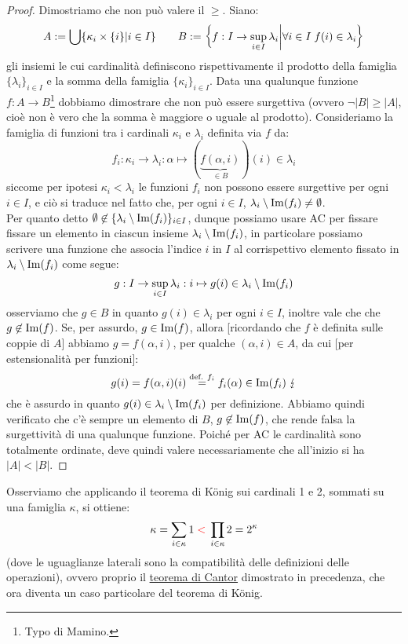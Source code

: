 \begin{proof}
	Dimostriamo che non può valere il $\geq$. Siano:
	\[ A := \bigcup\{\kappa_i \times \{i\} | i \in I\} \qquad B := \left\{f : I \rightarrow \sup_{i \in I} \lambda_i \middle| \forall i \in I \; f(i) \in \lambda_i\right\} 
		\]
	gli insiemi le cui cardinalità definiscono rispettivamente il prodotto della famiglia $\{\lambda_i\}_{i \in I}$ e la somma della famiglia $\{\kappa_i\}_{i \in I}$.
	Data una qualunque funzione $f : A \rightarrow B$\footnote{Typo di Mamino.} dobbiamo dimostrare che non può essere surgettiva (ovvero $\neg |B| \geq |A|$, cioè non è vero che la somma è maggiore o uguale al prodotto).
	Consideriamo la famiglia di funzioni tra i cardinali $\kappa_i$ e $\lambda_i$ definita via $f$ da:
	\[ f_i : \kappa_i \to \lambda_i : \alpha \mapsto (\underbrace{f(\alpha,i)}_{\in B})(i) \in \lambda_i
		\]
 	siccome per ipotesi $\kappa_i < \lambda_i$ le funzioni $f_i$ non possono essere surgettive per ogni $i \in I$, e ciò si traduce nel fatto che, per ogni $i \in I$, $\lambda_i \setminus\operatorname{Im}(f_i) \ne \emptyset$.\\
	Per quanto detto $\emptyset \not \in \{\lambda_i \setminus\operatorname{Im}(f_i)\}_{i \in I}$, dunque possiamo usare AC per fissare fissare un elemento in ciascun insieme $\lambda_i \setminus\operatorname{Im}(f_i)$, in particolare possiamo
	scrivere una funzione che associa l'indice $i$ in $I$ al corrispettivo elemento fissato in $\lambda_i \setminus \operatorname{Im}(f_i)$ come segue:
	\[ g : I \rightarrow \sup_{i \in I} \lambda_i : i \mapsto g(i) \in \lambda_i \setminus \operatorname{Im}(f_i)
		\]
	osserviamo che $g \in B$ in quanto $g(i) \in \lambda_i$ per ogni $i \in I$, inoltre vale che che $g \not \in \operatorname{Im}(f)$. Se, per assurdo, $g \in \operatorname{Im}(f)$, allora [ricordando che $f$ è definita sulle coppie di $A$]
	abbiamo $g = f(\alpha,i)$, per qualche $(\alpha, i) \in A$, da cui [per estensionalità per funzioni]: 
	\[ g(i) = f(\alpha,i)(i) \overset{\text{def. $f_i$}}{=} f_i(\alpha) \in \operatorname{Im}(f_i) \; \lightning
		\]
	che è assurdo in quanto $g(i) \in \lambda_i \setminus \operatorname{Im}(f_i)$ per definizione. Abbiamo quindi verificato che c'è sempre un elemento di $B$, $g \not \in \operatorname{Im}(f)$, che rende falsa la surgettività di una qualunque funzione.
	Poiché per AC le cardinalità sono totalmente ordinate, deve quindi valere necessariamente che all'inizio si ha $|A| < |B|$.
\end{proof}

\begin{example}
	Osserviamo che applicando il teorema di König sui cardinali 1 e 2, sommati su una famiglia $\kappa$, si ottiene:
	\[ \kappa = \sum_{i \in \kappa} 1 \;\textcolor{red}{<}\; \prod_{i \in \kappa} 2 = 2^\kappa
		\]
	(dove le uguaglianze laterali sono la compatibilità delle definizioni delle operazioni), ovvero proprio il \hyperref[cantor]{teorema di Cantor} dimostrato in precedenza, che ora diventa un caso particolare del teorema di König.
\end{example}

